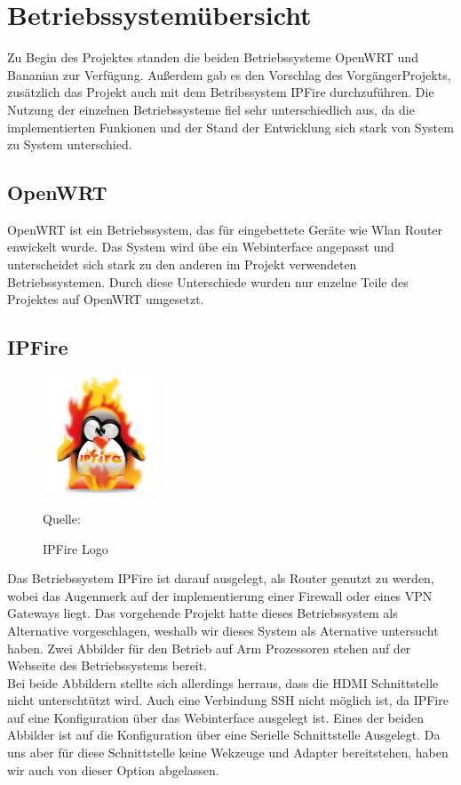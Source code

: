 \chapter{Betriebssystemübersicht}

Zu Begin des Projektes standen die beiden Betriebssysteme OpenWRT und Bananian zur Verfügung.
Außerdem gab es den Vorschlag des VorgängerProjekts, zusätzlich das Projekt auch mit dem Betribssystem IPFire durchzuführen.
Die Nutzung der einzelnen Betriebssysteme fiel sehr unterschiedlich aus, da die implementierten Funkionen und der Stand der Entwicklung sich stark von System zu System unterschied.

\section{OpenWRT}
OpenWRT ist ein Betriebssystem, das für eingebettete Geräte wie Wlan Router enwickelt wurde.
Das System wird übe ein Webinterface angepasst und unterscheidet sich stark zu den anderen im Projekt verwendeten Betriebssystemen.
Durch diese Unterschiede wurden nur enzelne Teile des Projektes auf OpenWRT umgesetzt.

\section{IPFire}
\begin{figure}
\centering
\includegraphics[width=3.5cm]{pictures/Jakob/IPFire}
\caption{IPFire Logo}
Quelle: \cite{fire1}
\end{figure}
Das Betriebssystem IPFire ist darauf ausgelegt, als Router genutzt zu werden, wobei das Augenmerk auf der implementierung einer Firewall oder eines VPN Gateways liegt.
Das vorgehende Projekt hatte dieses Betriebssystem als Alternative vorgeschlagen, weshalb wir dieses System als Aternative untersucht haben. Zwei Abbilder für den Betrieb auf Arm Prozessoren stehen auf der Webseite des Betriebssystems bereit. \cite{fire} \\
Bei beide Abbildern stellte sich allerdings herraus, dass die HDMI Schnittstelle nicht unterschtützt wird.
Auch eine Verbindung SSH nicht möglich ist, da IPFire auf eine Konfiguration über das Webinterface ausgelegt ist.
Eines der beiden Abbilder ist auf die Konfiguration über eine Serielle Schnittstelle Ausgelegt. Da uns aber für diese Schnittstelle keine Wekzeuge und Adapter bereitstehen, haben wir auch von dieser Option abgelassen.\\

